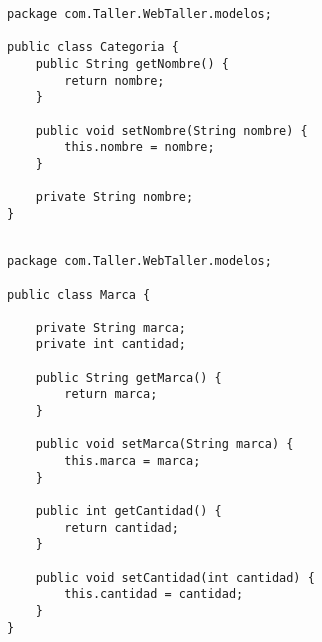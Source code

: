 

\begin{lstlisting}[caption=Categoria.java (LMSI)]
package com.Taller.WebTaller.modelos;

public class Categoria {
    public String getNombre() {
        return nombre;
    }

    public void setNombre(String nombre) {
        this.nombre = nombre;
    }

    private String nombre;
}
\end{lstlisting}
\clearpage
\begin{lstlisting}[caption=Marca.java (LMSI)]
  
package com.Taller.WebTaller.modelos;

public class Marca {

    private String marca;
    private int cantidad;

    public String getMarca() {
        return marca;
    }

    public void setMarca(String marca) {
        this.marca = marca;
    }

    public int getCantidad() {
        return cantidad;
    }

    public void setCantidad(int cantidad) {
        this.cantidad = cantidad;
    }
}
\end{lstlisting}
\clearpage
